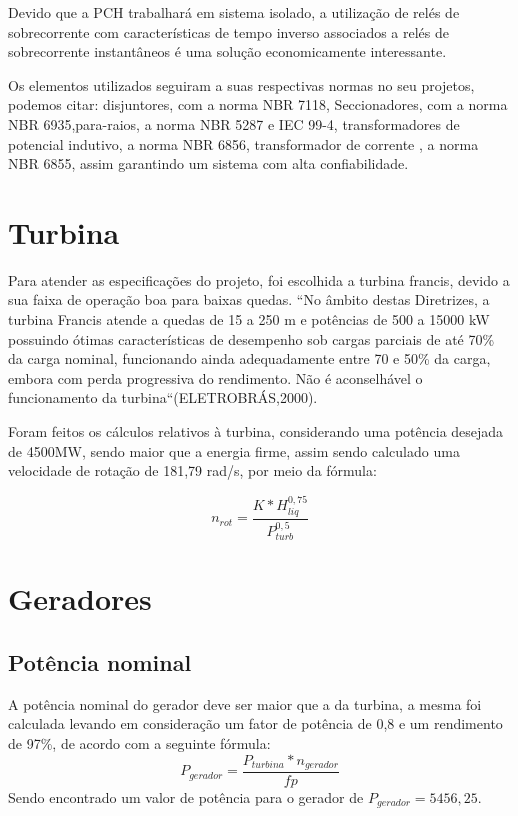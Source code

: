 Devido que a PCH trabalhará em sistema isolado, a utilização de relés de sobrecorrente com características de tempo inverso associados a relés de sobrecorrente instantâneos é uma solução economicamente interessante.

Os elementos utilizados seguiram a suas respectivas normas no seu projetos, podemos citar: disjuntores, com a norma NBR 7118, Seccionadores, com a norma NBR 6935,para-raios, a norma NBR 5287 e IEC 99-4, transformadores de potencial indutivo, a norma NBR 6856, transformador de corrente , a norma NBR 6855, assim garantindo um sistema com alta confiabilidade.

\section{Turbina}
Para atender as especificações do projeto, foi escolhida a turbina francis, devido a sua faixa de operação boa para baixas quedas. “No âmbito destas Diretrizes, a turbina Francis atende a quedas de 15 a 250 m e potências de 500 a 15000 kW possuindo ótimas características de desempenho sob cargas parciais de  até 70\% da carga nominal, funcionando ainda adequadamente entre 70 e 50\% da carga, embora com perda progressiva do rendimento. Não é aconselhável o funcionamento da turbina“(ELETROBRÁS,2000).

Foram feitos os cálculos relativos à turbina, considerando uma potência desejada de 4500MW, sendo maior que a energia firme, assim sendo calculado uma velocidade de rotação de 181,79 rad/s, por meio da fórmula:

\begin{equation}
	n_{rot}= \dfrac{K*H^{0,75}_{liq}}{P_{turb}^{0,5}}
	\end{equation}

\section{Geradores}
\subsection{Potência nominal}
A potência nominal do gerador deve ser maior que a da turbina, a mesma foi calculada levando em consideração um fator de potência de 0,8 e um rendimento de 97\%, de acordo com a seguinte fórmula:
\begin{equation}
P_{gerador} = \dfrac{P_{turbina}*n_{gerador}}{fp}
\end{equation}
Sendo encontrado um valor de potência para o gerador de $P_{gerador} = 5456,25$.


